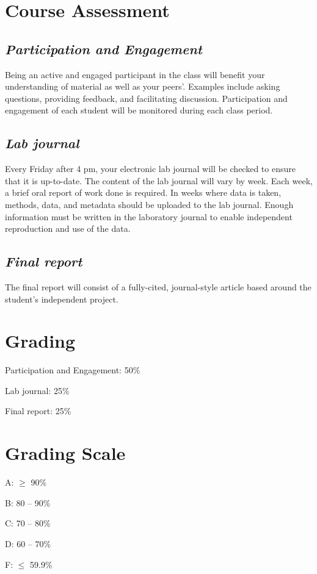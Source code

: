 \documentclass[12pt, notitlepage]{article}   	%
\begin{document}
{\section{Course Assessment}
\subsection{\textit{Participation and Engagement}}
Being an active and engaged participant in the class will benefit your understanding
of material as well as your peers'. Examples include asking questions, providing feedback,
and facilitating discussion. Participation and engagement of each student will be monitored
during each class period.

\subsection{\textit{Lab journal}}
Every Friday after 4 pm, your electronic lab journal will be checked to ensure that it 
is up-to-date. The content of the lab journal will vary by week. 
Each week, a brief oral report of work done is required. 
In weeks where data is taken, methods, data, and metadata 
should be uploaded to the lab journal. Enough information must be written in the 
laboratory journal to enable independent reproduction and use of the data.

\subsection{\textit{Final report}}
The final report will consist of a fully-cited, journal-style article based around the 
student’s independent project.

\section{Grading}
Participation and Engagement: 50\% \par
Lab journal: 25\% \par
Final report: 25\% \par

\section{Grading Scale}
A: $\geq$ 90\% \par
B: 80 – 90\% \par
C: 70 – 80\% \par
D: 60 – 70\% \par
F: $\leq$ 59.9\% \par

}
\end{document}
